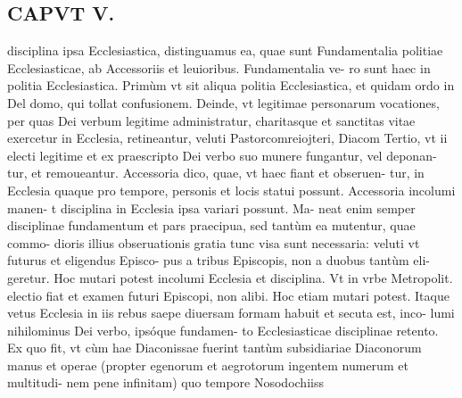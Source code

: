 \documentclass{article}
\begin{document}
\begin{pages}
\section*{CAPVT  V. }
\marginpar{[ p.289 ]}\pstart disciplina ipsa Ecclesiastica, distinguamus ea, quae sunt Fundamentalia politiae Ecclesiasticae, ab Accessoriis et leuioribus. Fundamentalia ve- ro sunt haec in politia Ecclesiastica. Primùm vt sit aliqua politia Ecclesiastica, et quidam ordo in Del domo, qui tollat confusionem. Deinde, vt legitimae personarum vocationes, per quas Dei verbum legitime administratur, charitasque et sanctitas vitae exercetur in Ecclesia, retineantur, veluti Pastorcomreiojteri, Diacom  \pend\pstart Tertio, vt ii electi legitime et ex praescripto Dei verbo suo munere fungantur, vel deponan- tur, et remoueantur.  \pend\pstart Accessoria dico, quae, vt haec fiant et obseruen- tur, in Ecclesia quaque pro tempore, personis et locis statui possunt. Accessoria incolumi manen- t disciplina in Ecclesia ipsa variari possunt. Ma- neat enim semper disciplinae fundamentum et pars praecipua, sed tantùm ea mutentur, quae commo- dioris illius obseruationis gratia tunc visa sunt necessaria: veluti vt futurus et eligendus Episco- pus a tribus Episcopis, non a duobus tantùm eli- geretur. Hoc mutari potest incolumi Ecclesia et disciplina. Vt in vrbe Metropolit. electio fiat et examen futuri Episcopi, non alibi. Hoc etiam mutari potest. Itaque vetus Ecclesia in iis rebus saepe diuersam formam habuit et secuta est, inco- lumi nihilominus Dei verbo, ipsóque fundamen- to Ecclesiasticae disciplinae retento. Ex quo fit, vt cùm hae Diaconissae fuerint tantùm subsidiariae Diaconorum manus et operae (propter egenorum et aegrotorum ingentem numerum et multitudi- nem pene infinitam) quo tempore Nosodochiiss  \pend

\end{pages}
\end{document}
